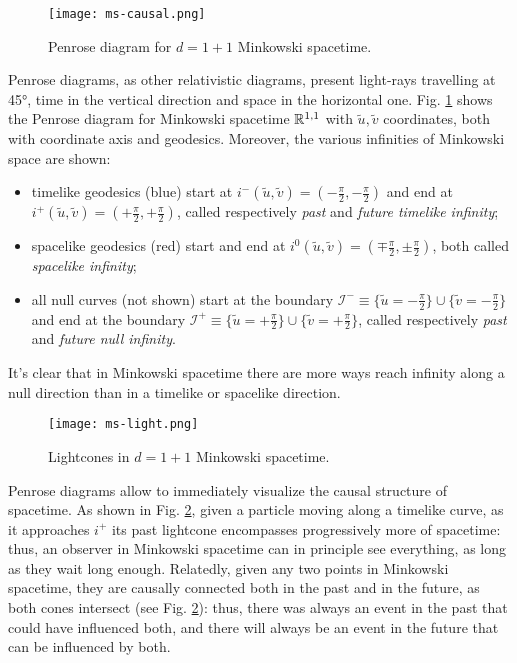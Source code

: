 \begin{figure}
  \centering
  \texttt{[image: ms-causal.png]}
  \caption{Penrose diagram for $ d = 1 + 1 $ Minkowski spacetime.}
  \label{ms-causal}
\end{figure}

Penrose diagrams, as other relativistic diagrams, present light-rays travelling at 45°, time in the vertical direction and space in the horizontal one. Fig. \ref{ms-causal} shows the Penrose diagram for Minkowski spacetime $ \mathbb{R}^{1,1} $ with $ \tilde{u},\tilde{v} $ coordinates, both with coordinate axis and geodesics. Moreover, the various infinities of Minkowski space are shown:
\begin{itemize}
  \item timelike geodesics (blue) start at $ i^- (\tilde{u},\tilde{v}) = \left( -\frac{\pi}{2}, -\frac{\pi}{2} \right) $ and end at $ i^+ (\tilde{u},\tilde{v}) = \left( +\frac{\pi}{2}, +\frac{\pi}{2} \right) $, called respectively \textit{past} and \textit{future timelike infinity};
  \item spacelike geodesics (red) start and end at $ i^0 (\tilde{u},\tilde{v}) = \left( \mp \frac{\pi}{2}, \pm \frac{\pi}{2} \right) $, both called \textit{spacelike infinity};
  \item all null curves (not shown) start at the boundary $ \mathcal{I}^- \equiv \{\tilde{u} = - \frac{\pi}{2}\} \cup \{\tilde{v} = - \frac{\pi}{2}\} $ and end at the boundary $ \mathcal{I}^+ \equiv \{\tilde{u} = +\frac{\pi}{2}\} \cup \{\tilde{v} = +\frac{\pi}{2}\} $, called respectively \textit{past} and \textit{future null infinity}.
\end{itemize}
It's clear that in Minkowski spacetime there are more ways reach infinity along a null direction than in a timelike or spacelike direction.

\begin{figure}
  \centering
  \texttt{[image: ms-light.png]}
  \caption{Lightcones in $ d = 1 + 1 $ Minkowski spacetime.}
  \label{ms-light}
\end{figure}

Penrose diagrams allow to immediately visualize the causal structure of spacetime. As shown in Fig. \ref{ms-light}, given a particle moving along a timelike curve, as it approaches $ i^+ $ its past lightcone encompasses progressively more of spacetime: thus, an observer in Minkowski spacetime can in principle see everything, as long as they wait long enough. Relatedly, given any two points in Minkowski spacetime, they are causally connected both in the past and in the future, as both cones intersect (see Fig. \ref{ms-light}): thus, there was always an event in the past that could have influenced both, and there will always be an event in the future that can be influenced by both.

